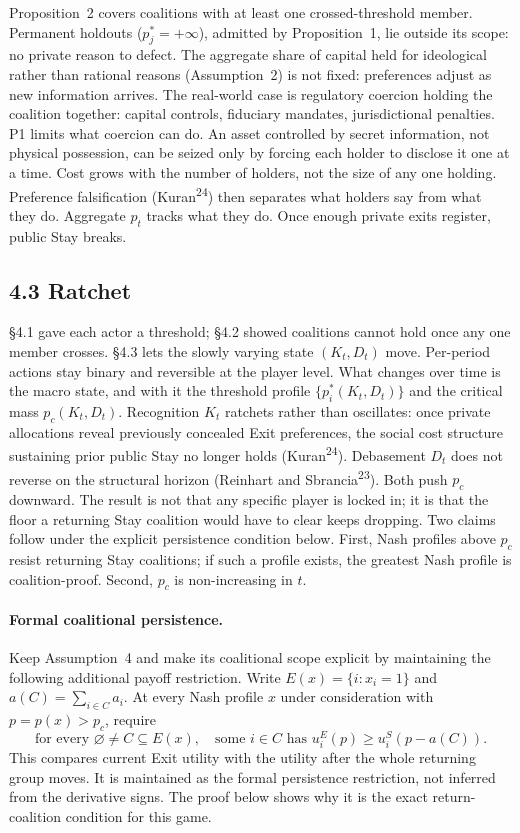 \documentclass[12pt]{article}
\theoremstyle{definition}
\theoremstyle{remark}
\begin{document}
Proposition~2 covers coalitions with at least one crossed-threshold member. Permanent holdouts ($p_j^* = +\infty$), admitted by Proposition~1, lie outside its scope: no private reason to defect. The aggregate share of capital held for ideological rather than rational reasons (Assumption~2) is not fixed: preferences adjust as new information arrives. The real-world case is regulatory coercion holding the coalition together: capital controls, fiduciary mandates, jurisdictional penalties. P1 limits what coercion can do. An asset controlled by secret information, not physical possession, can be seized only by forcing each holder to disclose it one at a time. Cost grows with the number of holders, not the size of any one holding. Preference falsification (Kuran\textsuperscript{24}) then separates what holders say from what they do. Aggregate $p_t$ tracks what they do. Once enough private exits register, public Stay breaks.

\subsection{4.3 Ratchet}

\S4.1 gave each actor a threshold; \S4.2 showed coalitions cannot hold once any one member crosses. \S4.3 lets the slowly varying state $(K_t, D_t)$ move. Per-period actions stay binary and reversible at the player level. What changes over time is the macro state, and with it the threshold profile $\{p_i^*(K_t, D_t)\}$ and the critical mass $p_c(K_t, D_t)$. Recognition $K_t$ ratchets rather than oscillates: once private allocations reveal previously concealed Exit preferences, the social cost structure sustaining prior public Stay no longer holds (Kuran\textsuperscript{24}). Debasement $D_t$ does not reverse on the structural horizon (Reinhart and Sbrancia\textsuperscript{23}). Both push $p_c$ downward. The result is not that any specific player is locked in; it is that the floor a returning Stay coalition would have to clear keeps dropping. Two claims follow under the explicit persistence condition below. First, Nash profiles above $p_c$ resist returning Stay coalitions; if such a profile exists, the greatest Nash profile is coalition-proof. Second, $p_c$ is non-increasing in $t$.

\paragraph*{Formal coalitional persistence.}
Keep Assumption~4 and make its coalitional scope explicit by maintaining the following additional payoff restriction. Write $E(x)=\{i:x_i=1\}$ and $a(C)=\sum_{i\in C}a_i$. At every Nash profile $x$ under consideration with $p=p(x)>p_c$, require
\[
 \text{for every }\varnothing\ne C\subseteq E(x),\quad
 \text{some }i\in C\text{ has }u_i^E(p)\ge u_i^S(p-a(C)).\tag{NR}
\]
This compares current Exit utility with the utility after the whole returning group moves. It is maintained as the formal persistence restriction, not inferred from the derivative signs. The proof below shows why it is the exact return-coalition condition for this game.
\end{document}

